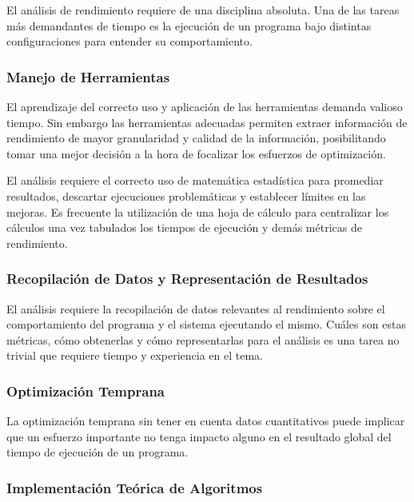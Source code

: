 \documentclass[a4paper]{report}
\begin{document}
\bigskip

El análisis de rendimiento requiere de una disciplina absoluta. Una de las tareas más demandantes de tiempo es la ejecución de un programa bajo distintas configuraciones para entender su comportamiento.

\subsubsection{Manejo de Herramientas}

El aprendizaje del correcto uso y aplicación de las herramientas demanda valioso tiempo.
Sin embargo las herramientas adecuadas permiten extraer información de rendimiento de mayor granularidad y calidad de la información, posibilitando tomar una mejor decisión a la hora de focalizar los esfuerzos de optimización.

\bigskip

El análisis requiere el correcto uso de matemática estadística para promediar resultados, descartar ejecuciones problemáticas y establecer límites en las mejoras. Es frecuente la utilización de una hoja de cálculo para centralizar los cálculos una vez tabulados los tiempos de ejecución y demás métricas de rendimiento.

\subsubsection{Recopilación de Datos y Representación de Resultados}

El análisis requiere la recopilación de datos relevantes al rendimiento sobre el comportamiento del programa y el sistema ejecutando el mismo. Cuáles son estas métricas, cómo obtenerlas y cómo representarlas para el análisis es una tarea no trivial que requiere tiempo y experiencia en el tema.

\subsubsection{Optimización Temprana}

La optimización temprana sin tener en cuenta datos cuantitativos puede implicar que un esfuerzo importante no tenga impacto alguno en el resultado global del tiempo de ejecución de un programa.

\subsubsection{Implementación Teórica de Algoritmos}
\end{document}
